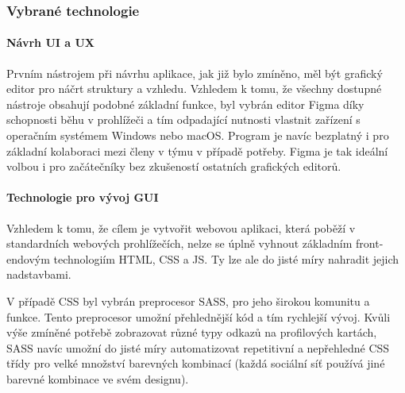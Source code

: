 \begin{itemize}
\begin{itemize}
		\subsubsection{Vybrané technologie}

			\paragraph{Návrh UI a UX}

			Prvním nástrojem při návrhu aplikace, jak již bylo zmíněno, měl být grafický editor pro náčrt struktury a vzhledu.
			Vzhledem k tomu, že všechny dostupné nástroje obsahují podobné základní funkce, byl vybrán editor Figma díky
			schopnosti běhu v prohlížeči a tím odpadající nutnosti vlastnit zařízení s operačním systémem Windows nebo macOS.
			Program je navíc bezplatný i pro základní kolaboraci mezi členy v týmu v případě potřeby.
			Figma je tak ideální volbou i pro začátečníky bez zkušeností ostatních grafických editorů.

			\paragraph{Technologie pro vývoj GUI}

			Vzhledem k tomu, že cílem je vytvořit webovou aplikaci, která poběží v standardních webových prohlížečích,
			nelze se úplně vyhnout základním front-endovým technologiím \Ac{HTML}, \Ac{CSS} a \ac{JS}.
			Ty lze ale do jisté míry nahradit jejich nadstavbami.

			V případě \Ac{CSS} byl vybrán preprocesor \Ac{SASS}, pro jeho širokou komunitu a funkce.
			Tento preprocesor umožní přehlednější kód a tím rychlejší vývoj.
			Kvůli výše zmíněné potřebě zobrazovat různé typy odkazů na profilových kartách, \ac{SASS} navíc umožní
			do jisté míry automatizovat repetitivní a nepřehledné \ac{CSS} třídy pro velké množství barevných kombinací
			(každá sociální síť používá jiné barevné kombinace ve svém designu).


\end{itemize}
\end{itemize}
